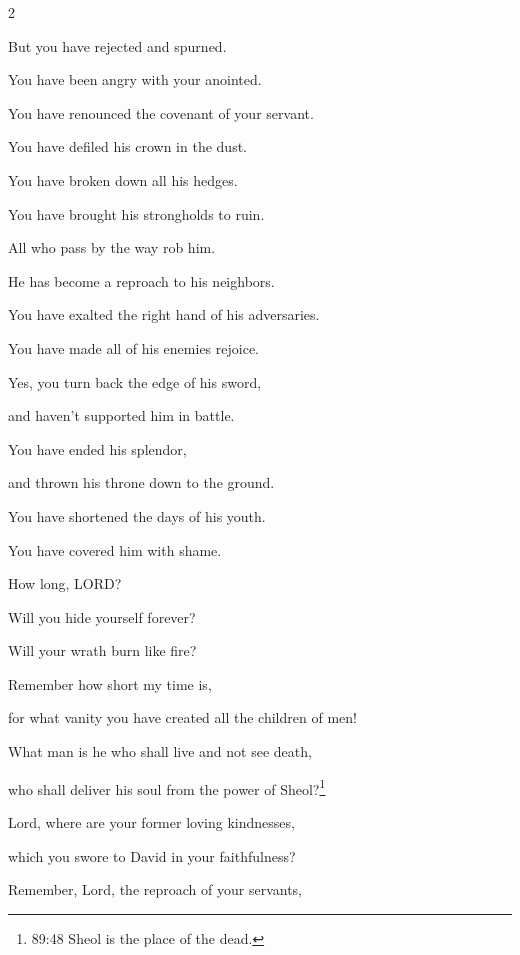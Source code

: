 \begin{multicols}{2}
	
	\myverse{}But you have rejected and spurned.
	
	You have been angry with your anointed.
	
	
	\myverse{}You have renounced the covenant of your servant.
	
	You have defiled his crown in the dust.
	
	
	\myverse{}You have broken down all his hedges.
	
	You have brought his strongholds to ruin.
	
	
	\myverse{}All who pass by the way rob him.
	
	He has become a reproach to his neighbors.
	
	
	\myverse{}You have exalted the right hand of his adversaries.
	
	You have made all of his enemies rejoice.
	
	
	\myverse{}Yes, you turn back the edge of his sword,
	
	and haven’t supported him in battle.
	
	
	\myverse{}You have ended his splendor,
	
	and thrown his throne down to the ground.
	
	
	\myverse{}You have shortened the days of his youth.
	
	You have covered him with shame.
	
	\vspace{\baselineskip}
	
	
	\myverse{}How long, LORD?
	
	Will you hide yourself forever?
	
	Will your wrath burn like fire?
	
	
	\myverse{}Remember how short my time is,
	
	for what vanity you have created all the children of men!
	
	
	\myverse{}What man is he who shall live and not see death,
	
	who shall deliver his soul from the power of Sheol?\footnote{89:48 Sheol is the place of the dead.}
	
	\vspace{\baselineskip}
	
	
	\myverse{}Lord, where are your former loving kindnesses,
	
	which you swore to David in your faithfulness?
	
	
	\myverse{}Remember, Lord, the reproach of your servants,
	

\end{multicols}
